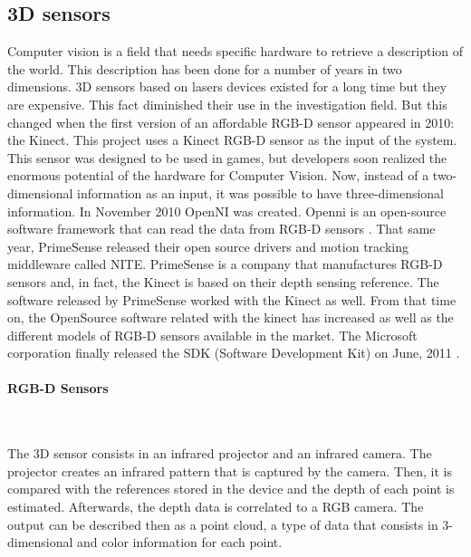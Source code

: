 \subsection{3D sensors}

Computer vision is a field that needs specific hardware to retrieve a description of the world. 
This description has been done for a number of years in two dimensions. 
3D sensors based on lasers devices existed for a long time but they are expensive. 
This fact diminished their use in the investigation field. 
But this changed when the first version of an affordable RGB-D sensor appeared in 2010: the Kinect. 
This project uses a Kinect RGB-D sensor as the input of the system.
\\

This sensor was designed to be used in games, but developers soon realized the enormous potential of the hardware for Computer Vision.  
Now, instead of a two-dimensional information as an input, it was possible to have three-dimensional information. 
In November 2010 OpenNI was created. Openni is an open-source software framework that can read the data from RGB-D sensors \cite{openni}.  
That same year, PrimeSense released their open source drivers and motion tracking middleware called NITE\cite{NITE}. 
PrimeSense is a company that manufactures RGB-D sensors and, in fact, the Kinect is based on their depth sensing reference. 
The software released by PrimeSense worked with the Kinect as well. 
From that time on, the OpenSource software related with the kinect has increased as well as the different models of RGB-D sensors available in the market.
The Microsoft corporation finally released the SDK (Software Development Kit) on June, 2011 \cite{kinectSDK}.



\paragraph{RGB-D Sensors}\mbox{}\\

\label{rgb-d}

The 3D sensor consists in an infrared projector and an infrared camera. 
The projector creates an infrared pattern that is captured by the camera.
Then, it is compared with the references stored in the device and the depth of each point is estimated. 
Afterwards, the depth data is correlated to a RGB camera. 
The output can be described then as a point cloud, a type of data that consists in 3-dimensional and color information for each point.  
\\

